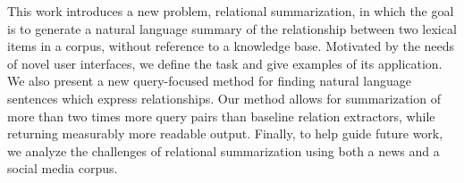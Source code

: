 This work introduces a new problem, relational summarization, in which the goal is to generate a natural language summary of the relationship between two lexical items in a corpus, without reference to a knowledge base. Motivated by the needs of novel user interfaces, we define the task and give examples of its application. We also present a new query-focused method for finding natural language sentences which express relationships. Our method allows for summarization of more than two times more query pairs than baseline relation extractors, while returning measurably more readable output. Finally, to help guide future work, we analyze the challenges of relational summarization using both a news and a social media corpus.
